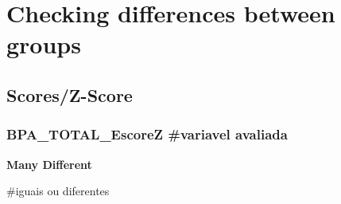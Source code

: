 \documentclass[
]{article}
\begin{document}
\section{\texorpdfstring{\textbf{Checking differences between
groups}}{Checking differences between groups}}\label{checking-differences-between-groups-3}

\subsection{\texorpdfstring{\textbf{Scores/Z-Score}}{Scores/Z-Score}}\label{scoresz-score-3}

\subsubsection{BPA\_TOTAL\_EscoreZ \#variavel
avaliada}\label{bpa_total_escorez-variavel-avaliada}

\textbf{Many Different}

\#iguais ou diferentes
\end{document}
